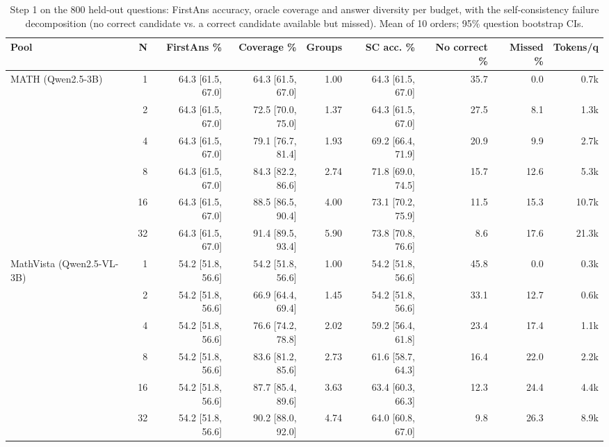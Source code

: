 \begin{table}[t]
\centering
\small
\caption{Step 1 on the 800 held-out questions: FirstAns accuracy, oracle coverage and answer diversity per budget, with the self-consistency failure decomposition (no correct candidate vs. a correct candidate available but missed). Mean of 10 orders; 95\% question bootstrap CIs.}
\label{tab:T2_sampling_opportunity}
\begin{tabular}{lrrrrrrrr}
\toprule
Pool & N & FirstAns \% & Coverage \% & Groups & SC acc. \% & No correct \% & Missed \% & Tokens/q \\
\midrule
MATH (Qwen2.5-3B) & 1 & 64.3 [61.5, 67.0] & 64.3 [61.5, 67.0] & 1.00 & 64.3 [61.5, 67.0] & 35.7 & 0.0 & 0.7k \\
 & 2 & 64.3 [61.5, 67.0] & 72.5 [70.0, 75.0] & 1.37 & 64.3 [61.5, 67.0] & 27.5 & 8.1 & 1.3k \\
 & 4 & 64.3 [61.5, 67.0] & 79.1 [76.7, 81.4] & 1.93 & 69.2 [66.4, 71.9] & 20.9 & 9.9 & 2.7k \\
 & 8 & 64.3 [61.5, 67.0] & 84.3 [82.2, 86.6] & 2.74 & 71.8 [69.0, 74.5] & 15.7 & 12.6 & 5.3k \\
 & 16 & 64.3 [61.5, 67.0] & 88.5 [86.5, 90.4] & 4.00 & 73.1 [70.2, 75.9] & 11.5 & 15.3 & 10.7k \\
 & 32 & 64.3 [61.5, 67.0] & 91.4 [89.5, 93.4] & 5.90 & 73.8 [70.8, 76.6] & 8.6 & 17.6 & 21.3k \\
MathVista (Qwen2.5-VL-3B) & 1 & 54.2 [51.8, 56.6] & 54.2 [51.8, 56.6] & 1.00 & 54.2 [51.8, 56.6] & 45.8 & 0.0 & 0.3k \\
 & 2 & 54.2 [51.8, 56.6] & 66.9 [64.4, 69.4] & 1.45 & 54.2 [51.8, 56.6] & 33.1 & 12.7 & 0.6k \\
 & 4 & 54.2 [51.8, 56.6] & 76.6 [74.2, 78.8] & 2.02 & 59.2 [56.4, 61.8] & 23.4 & 17.4 & 1.1k \\
 & 8 & 54.2 [51.8, 56.6] & 83.6 [81.2, 85.6] & 2.73 & 61.6 [58.7, 64.3] & 16.4 & 22.0 & 2.2k \\
 & 16 & 54.2 [51.8, 56.6] & 87.7 [85.4, 89.6] & 3.63 & 63.4 [60.3, 66.3] & 12.3 & 24.4 & 4.4k \\
 & 32 & 54.2 [51.8, 56.6] & 90.2 [88.0, 92.0] & 4.74 & 64.0 [60.8, 67.0] & 9.8 & 26.3 & 8.9k \\
\bottomrule
\end{tabular}
\end{table}
